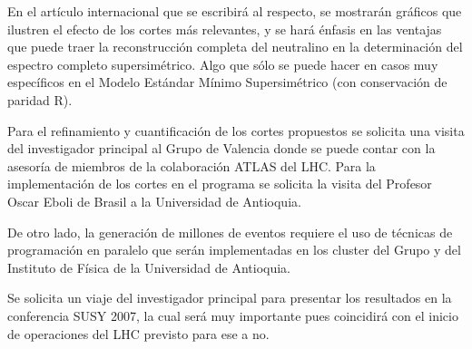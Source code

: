 En el artículo internacional que se escribirá al respecto, se
mostrarán gráficos que ilustren el efecto de los cortes más
relevantes, y se hará énfasis en las ventajas que puede traer la
reconstrucción completa del neutralino en la determinación del
espectro completo supersimétrico. Algo que sólo se puede hacer en
casos muy específicos en el Modelo Estándar Mínimo Supersimétrico (con
conservación de paridad R).

Para el refinamiento y cuantificación de los cortes propuestos se
solicita una visita del investigador principal al Grupo de Valencia
donde se puede contar con la asesoría de miembros de la colaboración
ATLAS del LHC. Para la implementación de los cortes en el programa se
solicita la visita del Profesor Oscar Eboli de Brasil a la Universidad
de Antioquia.

De otro lado, la generación de millones de eventos requiere el uso de
técnicas de programación en paralelo que serán implementadas en los
cluster del Grupo y del Instituto de Física de la Universidad de
Antioquia.

Se solicita un viaje del investigador principal para presentar los
resultados en la conferencia SUSY 2007, la cual será muy importante
pues coincidirá con el inicio de operaciones del LHC previsto para ese
a no.

